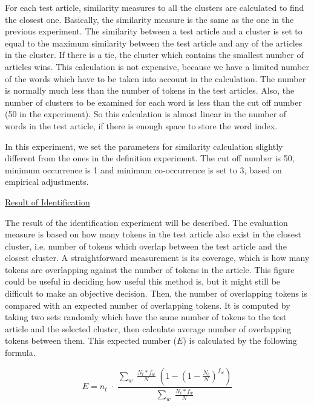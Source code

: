 For each test article, similarity measures to all the clusters are calculated 
to find the closest one.
Basically, the similarity measure is the same as the one in the previous experiment.
The similarity between a test article and a cluster is set to equal to
the maximum similarity between the test article and any of the articles in the cluster.
If there is a tie, the cluster which contains the smallest number of articles wins.
This calculation is not expensive, because we have a limited number of
the words which have to be taken into account in the calculation.
The number is normally much less than the number of tokens in the test articles.
Also, the number of clusters to be examined for each word
is less than the cut off number (50 in the experiment).
So this calculation is almost linear in the number of words in the test article,
if there is enough space to store the word index.

In this experiment, we set the parameters for similarity calculation
slightly different from the ones in the definition experiment.
The cut off number is 50, minimum occurrence is 1 and minimum co-occurrence
is set to 3, based on empirical adjustments.

\begin{flushleft}
\underline{Result of Identification} \\
\end{flushleft}

The result of the identification experiment will be described.
The evaluation measure is based on how many tokens in the test article
also exist in the closest cluster,
i.e. number of tokens which overlap between the test article and the closest cluster.
A straightforward measurement is its coverage, which is
how many tokens are overlapping against the number of tokens in the article.
This figure could be useful in deciding how useful this method is,
but it might still be difficult to make an objective decision.
Then, the number of overlapping tokens is compared with 
an expected number of overlapping tokens.
It is computed by taking two sets randomly which have the same
number of tokens to the test article and the selected cluster,
then calculate average number of overlapping tokens between them.
This expected number ($E$) is calculated by the following formula.

\begin{equation}
 E =  n_{t} \; \cdot \; \frac{\sum_{w} \; \frac{N_{t} * f_{w}}{N} 
              \; ( 1 - ( 1 - \frac{N_{c}}{N} )^{f_{w}})}
	{\sum_{w} \; \frac{N_{t} * f_{w}}{N}}
\end{equation}

